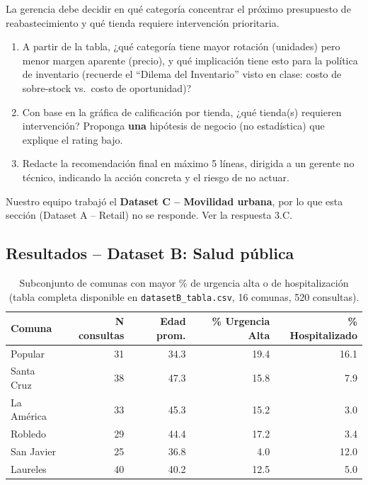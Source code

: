 \documentclass[11pt]{article}
\begin{document}
\begin{pregunta}
La gerencia debe decidir en qué categoría concentrar el próximo presupuesto de reabastecimiento y qué tienda requiere intervención prioritaria.
\begin{enumerate}[label=\alph*)]
  \item A partir de la tabla, ¿qué categoría tiene mayor rotación (unidades) pero menor margen aparente (precio), y qué implicación tiene esto para la política de inventario (recuerde el ``Dilema del Inventario'' visto en clase: costo de sobre-stock vs.\ costo de oportunidad)?
  \item Con base en la gráfica de calificación por tienda, ¿qué tienda(s) requieren intervención? Proponga \textbf{una} hipótesis de negocio (no estadística) que explique el rating bajo.
  \item Redacte la recomendación final en máximo 5 líneas, dirigida a un gerente no técnico, indicando la acción concreta y el riesgo de no actuar.
\end{enumerate}
\end{pregunta}
\begin{aviso}[No aplica]
Nuestro equipo trabajó el \textbf{Dataset C -- Movilidad urbana}, por lo que esta sección (Dataset A -- Retail) no se responde. Ver la respuesta 3.C.
\end{aviso}

\subsection*{Resultados -- Dataset B: Salud pública}
\begin{table}[H]
\centering
\small
\begin{tabular}{lrrrr}
\toprule
Comuna & N consultas & Edad prom. & \% Urgencia Alta & \% Hospitalizado \\
\midrule
Popular          & 31 & 34.3 & 19.4 & 16.1 \\
Santa Cruz       & 38 & 47.3 & 15.8 & 7.9 \\
La América       & 33 & 45.3 & 15.2 & 3.0 \\
Robledo          & 29 & 44.4 & 17.2 & 3.4 \\
San Javier       & 25 & 36.8 & 4.0  & 12.0 \\
Laureles         & 40 & 40.2 & 12.5 & 5.0 \\
\bottomrule
\end{tabular}
\caption{Subconjunto de comunas con mayor \% de urgencia alta o de hospitalización (tabla completa disponible en \texttt{datasetB\_tabla.csv}, 16 comunas, 520 consultas).}
\end{table}
\end{document}
